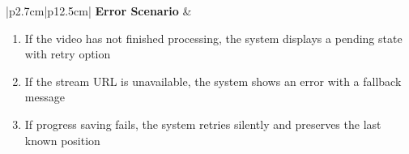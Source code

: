 \begin{table}[H]
\begin{tabular}{|p{2.7cm}|p{12.5cm}|}
            \hline
            \textbf{Error Scenario} & \begin{minipage}[t]{\linewidth}
                                          \begin{enumerate}[topsep=0pt,itemsep=1pt,parsep=0pt,partopsep=0pt]
                                              \item If the video has not finished processing, the system displays a pending state
                                                    with retry option
                                              \item If the stream URL is unavailable, the system shows an error with a fallback
                                                    message
                                              \item If progress saving fails, the system retries silently and preserves the last
                                                    known position
                                          \end{enumerate}
                                      \end{minipage}       \\
            \hline
        \end{tabular}
        \label{tab:eng-watch-video}
    \end{table}
